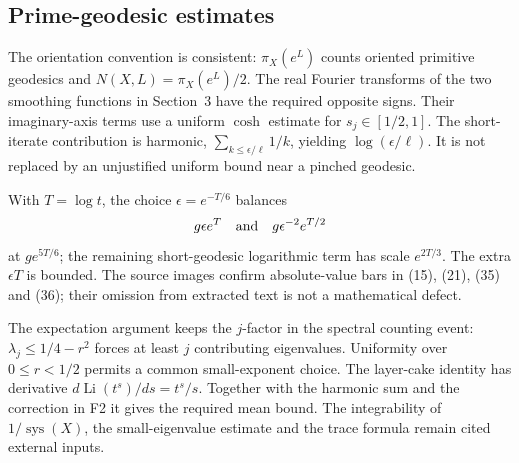 \documentclass[10pt]{article}
\begin{document}
\subsection*{Prime-geodesic estimates}
The orientation convention is consistent: \(\pi_X(e^L)\) counts oriented primitive geodesics and \(N(X,L)=\pi_X(e^L)/2\). The real Fourier transforms of the two smoothing functions in Section 3 have the required opposite signs. Their imaginary-axis terms use a uniform \(\cosh\) estimate for \(s_j\in[1/2,1]\). The short-iterate contribution is harmonic, \(\sum_{k\le\epsilon/\ell}1/k\), yielding \(\log(\epsilon/\ell)\). It is not replaced by an unjustified uniform bound near a pinched geodesic.\par
With \(T=\log t\), the choice \(\epsilon=e^{-T/6}\) balances \[g\epsilon e^T
 \quad\hbox{and}\quad
 g\epsilon^{-2}e^{T/2}\] at \(ge^{5T/6}\); the remaining short-geodesic logarithmic term has scale \(e^{2T/3}\). The extra \(\epsilon T\) is bounded. The source images confirm absolute-value bars in (15), (21), (35) and (36); their omission from extracted text is not a mathematical defect.\par
The expectation argument keeps the \(j\)-factor in the spectral counting event: \(\lambda_j\le1/4-r^2\) forces at least \(j\) contributing eigenvalues. Uniformity over \(0\le r<1/2\) permits a common small-exponent choice. The layer-cake identity has derivative \(d\operatorname{Li}(t^s)/ds=t^s/s\). Together with the harmonic sum and the correction in F2 it gives the required mean bound. The integrability of \(1/\operatorname{sys}(X)\), the small-eigenvalue estimate and the trace formula remain cited external inputs.\par
\end{document}
